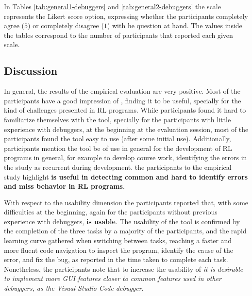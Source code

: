 % 

In Tables \ref{tab:general1-debuggers} and \ref{tab:general2-debuggers} the scale represents the 
Likert score option, expressing whether the participants completely agree ($5$) or completely disagree 
($1$) with he question at hand. The values inside the tables correspond to the number of participants 
that reported each given scale.

\subsection{Discussion}
\label{sec:discussion}

In general, the results of the empirical evaluation are very positive. Most of the participants have a 
good impression of \flik, finding it to be useful, specially for the kind of challenges presented in 
\ac{RL} programs. While participants found it hard to familiarize themselves with the tool, specially 
for the participants with little experience with debuggers, at the beginning at the evaluation session, 
most of the participants found the tool easy to use (after some initial use). Additionally, participants 
mention the tool be of use in general for the development of \ac{RL} programs in general, for example 
to develop course work, identifying the errors in the study as recurrent during development. the 
participants to the empirical study highlight \textbf{\flik is useful in detecting common and hard to 
identify errors and miss behavior in \ac{RL} programs}.

With respect to the usability dimension the participants reported that, with some difficulties at the 
beginning, again for the participants without previous experience with debuggers, 
\textbf{\flik is usable}. The usability of the tool is confirmed by the completion of the three tasks by a 
majority of the participants, and the rapid learning curve gathered when switching between tasks, 
reaching a faster and more fluent code navigation to inspect the program, identify the cause of the 
error, and fix the bug, as reported in the time taken to complete each task. Nonetheless, the 
participants note that to increase the usability of \flik \textit{it is desirable to implement more GUI 
features closer to common features used in other debuggers, as the Visual Studio Code debugger}.


\endinput


